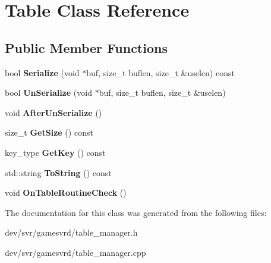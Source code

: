 \hypertarget{classTable}{
\section{Table Class Reference}
\label{classTable}
}
\subsection*{Public Member Functions}
\begin{DoxyCompactItemize}
\item 
\hypertarget{classTable_ad0952d646df0d2fad37aa71e6828b063}{
bool {\bfseries Serialize} (void $\ast$buf, size\_\-t buflen, size\_\-t \&uselen) const }
\label{classTable_ad0952d646df0d2fad37aa71e6828b063}

\item 
\hypertarget{classTable_acc66420ebab51b40799d14041d91f64d}{
bool {\bfseries UnSerialize} (void $\ast$buf, size\_\-t buflen, size\_\-t \&uselen)}
\label{classTable_acc66420ebab51b40799d14041d91f64d}

\item 
\hypertarget{classTable_a7de7db429f4969f21c7670315bf46f25}{
void {\bfseries AfterUnSerialize} ()}
\label{classTable_a7de7db429f4969f21c7670315bf46f25}

\item 
\hypertarget{classTable_a1fec31d028114d83d8fa8f292efdaa69}{
size\_\-t {\bfseries GetSize} () const }
\label{classTable_a1fec31d028114d83d8fa8f292efdaa69}

\item 
\hypertarget{classTable_a9729a722c9e8ac69528a3fcd5352d49f}{
key\_\-type {\bfseries GetKey} () const }
\label{classTable_a9729a722c9e8ac69528a3fcd5352d49f}

\item 
\hypertarget{classTable_a025ceec472aab8151ddd122dac1ced83}{
std::string {\bfseries ToString} () const }
\label{classTable_a025ceec472aab8151ddd122dac1ced83}

\item 
\hypertarget{classTable_a30712be24e89e69b5e253185147082ae}{
void {\bfseries OnTableRoutineCheck} ()}
\label{classTable_a30712be24e89e69b5e253185147082ae}

\end{DoxyCompactItemize}


The documentation for this class was generated from the following files:\begin{DoxyCompactItemize}
\item 
dev/svr/gamesvrd/table\_\-manager.h\item 
dev/svr/gamesvrd/table\_\-manager.cpp\end{DoxyCompactItemize}
